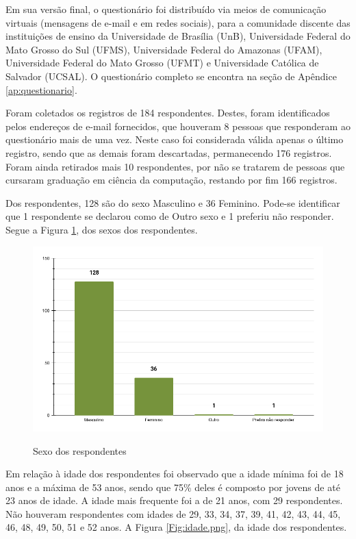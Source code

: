 \begin{apendicesenv}
Em sua versão final, o questionário foi distribuído via meios de comunicação virtuais (mensagens de e-mail e em redes sociais), para a comunidade discente das instituições de ensino da Universidade de Brasília (UnB), Universidade Federal do Mato Grosso do Sul (UFMS), Universidade Federal do Amazonas (UFAM), Universidade Federal do Mato Grosso (UFMT) e Universidade Católica de Salvador (UCSAL). O questionário completo se encontra na seção de Apêndice \ref{ap:questionario}. 


Foram coletados os registros de 184 respondentes. Destes, foram identificados pelos endereços de e-mail fornecidos, que houveram 8 pessoas que responderam ao questionário mais de uma vez. Neste caso foi considerada válida apenas o último registro, sendo que as demais foram descartadas, permanecendo 176 registros. Foram ainda retirados mais 10 respondentes, por não se tratarem de pessoas que cursaram graduação em ciência da computação, restando por fim 166 registros. 
 
Dos respondentes, 128 são do sexo Masculino e 36 Feminino. Pode-se identificar que 1 respondente se declarou como de Outro sexo e 1 preferiu não responder. Segue a Figura \ref{Fig:genero.png}, dos sexos dos respondentes.

\begin{figure}[htbp]
	\centering
	\caption{Sexo dos respondentes}
	\includegraphics[keepaspectratio=true,scale=0.54]{figuras/apendice/graficos_survey/genero.png}
	\label{Fig:genero.png}
\end{figure}

Em relação à idade dos respondentes foi observado que a idade mínima foi de 18 anos e a máxima de 53 anos, sendo que 75\% deles é composto por jovens de até 23 anos de idade. A idade mais frequente foi a de 21 anos, com 29 respondentes. Não houveram respondentes com idades de 29, 33, 34, 37, 39, 41, 42, 43, 44, 45, 46, 48, 49, 50, 51 e 52 anos. A Figura \ref{Fig:idade.png}, da idade dos respondentes.


\end{apendicesenv}

